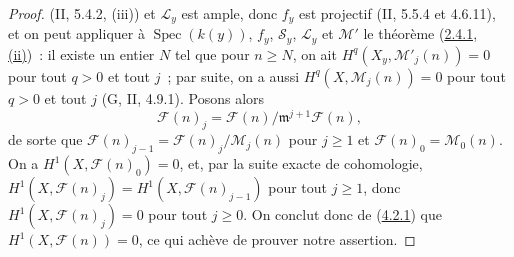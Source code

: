 \begin{proof}
(II, 5.4.2, (iii)) et $\mathcal L_y$ est ample, donc $f_y$ est projectif
(II, 5.5.4 et 4.6.11), et on peut appliquer à
$\operatorname{Spec}(k(y))$, $f_y$, $\mathcal S_y$, $\mathcal L_y$ et
$\mathcal M'$ le théorème (\hyperref[III.2.4.1-fr]{2.4.1, (ii)})~: il
existe un entier $N$ tel que pour $n\geq N$, on ait
$H^q(X_y,\mathcal M'_j(n))=0$ pour tout $q>0$ et tout $j$~; par suite, on a
aussi $H^q(X,\mathcal M_j(n))=0$ pour tout $q>0$ et tout $j$
(G, II, 4.9.1). Posons alors
\[
\mathcal F(n)_j=\mathcal F(n)/\mathfrak m^{j+1}\mathcal F(n),
\]
de sorte que $\mathcal F(n)_{j-1}=\mathcal F(n)_j/\mathcal M_j(n)$ pour
$j\geq1$ et $\mathcal F(n)_0=\mathcal M_0(n)$. On a
$H^1(X,\mathcal F(n)_0)=0$, et, par la suite exacte de cohomologie,
$H^1(X,\mathcal F(n)_j)=H^1(X,\mathcal F(n)_{j-1})$ pour tout $j\geq1$,
donc $H^1(X,\mathcal F(n)_j)=0$ pour tout $j\geq0$. On conclut donc de
(\hyperref[III.4.2.1-fr]{4.2.1}) que $H^1(X,\mathcal F(n))=0$, ce qui
achève de prouver notre assertion.



\end{proof}
